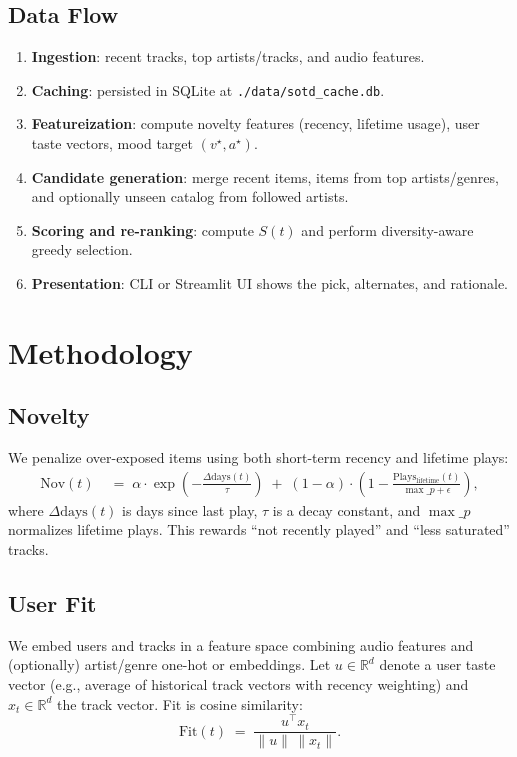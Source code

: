 \documentclass[11pt]{article}
\begin{document}
\subsection{Data Flow}
\begin{enumerate}[leftmargin=*]
  \item \textbf{Ingestion}: recent tracks, top artists/tracks, and audio features.
  \item \textbf{Caching}: persisted in SQLite at \texttt{./data/sotd\_cache.db}.
  \item \textbf{Featureization}: compute novelty features (recency, lifetime usage), user taste vectors, mood target $(v^\star,a^\star)$.
  \item \textbf{Candidate generation}: merge recent items, items from top artists/genres, and optionally unseen catalog from followed artists.
  \item \textbf{Scoring and re-ranking}: compute $S(t)$ and perform diversity-aware greedy selection.
  \item \textbf{Presentation}: CLI or Streamlit UI shows the pick, alternates, and rationale.
\end{enumerate}

\section{Methodology}
\subsection{Novelty}
We penalize over-exposed items using both short-term recency and lifetime plays:
\begin{align}
\mathrm{Nov}(t) \;&=\; \alpha \cdot \exp\!\left(-\frac{\Delta\mathrm{days}(t)}{\tau}\right) \;+\; (1-\alpha)\cdot \left(1 - \frac{\mathrm{Plays}_\mathrm{lifetime}(t)}{\max\_p + \epsilon}\right),
\label{eq:novelty}
\end{align}
where $\Delta\mathrm{days}(t)$ is days since last play, $\tau$ is a decay constant, and $\max\_p$ normalizes lifetime plays. This rewards ``not recently played'' and ``less saturated'' tracks.

\subsection{User Fit}
We embed users and tracks in a feature space combining audio features and (optionally) artist/genre one-hot or embeddings. Let $u \in \mathbb{R}^d$ denote a user taste vector (e.g., average of historical track vectors with recency weighting) and $x_t \in \mathbb{R}^d$ the track vector. Fit is cosine similarity:
\begin{equation}
\mathrm{Fit}(t) \;=\; \frac{u^\top x_t}{\lVert u\rVert \,\lVert x_t\rVert}.
\label{eq:fit}
\end{equation}
\end{document}
